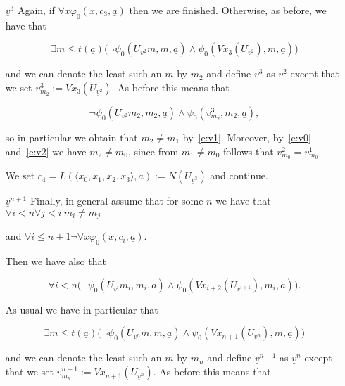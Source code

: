 \documentclass[1p]{elsarticle}
\newcommand{\tup}{\underline} %
\theoremstyle{plain}
\theoremstyle{definition}
\theoremstyle{remark}
\renewenvironment{proof}[1][]{\noindent{\bf Proof{#1}. }}{\nopagebreak[4]{\hspace*{\fill}


  $\Box$              %

 }{\vspace{2ex}}}
\renewcommand{\phi}{\varphi}
\theoremstyle{definition}
\begin{document}
{\begin{proof}
\begin{enumerate}
so in particular we obtain that $m_1\neq m_0$ by~\eqref{e:v0} as $U_{\tup v^1}m_1=v^1_{m_1}$. We set $c_3=L(\langle x_0,x_1,x_2\rangle,\tup a):=

N(U_{\tup v^2})$ and continue.

\item[$\tup v^3$] Again, if $\forall x \phi_0(x,c_3,\tup a)$ then we are finished. Otherwise, as before, we have that

\[

\exists m\leq t(\tup a) \big (\neg\psi_0(U_{\tup v^2}m,m,\tup a) \wedge \psi_0(Vx_3(U_{\tup v^2}),m,\tup a)\big)

\]

and we can denote the least such an $m$ by $m_2$ and define $\tup v^3$ as $\tup v^2$ except that we set $v^3_{m_2}:=Vx_3(U_{\tup v^2})$. As before this means that

\[ \neg\psi_0(U_{\tup v^2}m_2,m_2,\tup a) \wedge \psi_0(v^3_{m_2},m_2,\tup a), \tag{v2}\label{e:v2}\]

so in particular we obtain that $m_2\neq m_1$ by~\eqref{e:v1}. Moreover, by~\eqref{e:v0} and~\eqref{e:v2} we have $m_2\neq m_0$, since from $m_1\neq m_0$ follows that $v^2_{m_0}=v^1_{m_0}$.

 We set $c_4=L(\langle x_0,x_1,x_2,x_3\rangle,\tup a):=N(U_{\tup v^3})$ and continue.\\

\item[$\tup v^{n+1}$] Finally, in general assume that for some $n$ we have that $\forall i< n\forall j<i\ m_i\neq m_j$

 and $\forall i\leq n+1 \neg \forall x \phi_0(x,c_i,\tup a)$.

Then we have also that

\[ 

\forall i<n \big (\neg\psi_0(U_{\tup v^i}m_i,m_i,\tup a) \wedge \psi_0(Vx_{i+2}(U_{\tup v^{i+1}}),m_i,\tup a)\big). \tag{vi}\label{e:vi}

\]

As usual we have in particular that

\[ 

\exists m\leq t(\tup a) \big (\neg\psi_0(U_{\tup v^n}m,m,\tup a) \wedge \psi_0(Vx_{n+1}(U_{\tup v^n}),m,\tup a)\big)

\]

and we can denote the least such an $m$ by $m_n$ and define $\tup v^{n+1}$ as $\tup v^n$ except that we set $v^{n+1}_{m_n}:=Vx_{n+1}(U_{\tup v^n})$. As before this means that


\end{enumerate}
\end{proof}}
\end{document}
